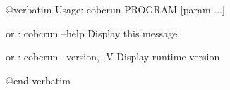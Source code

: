 @verbatim
Usage: cobcrun PROGRAM [param ...]

or   : cobcrun --help
       Display this message

or   : cobcrun --version, -V
       Display runtime version

@end verbatim

